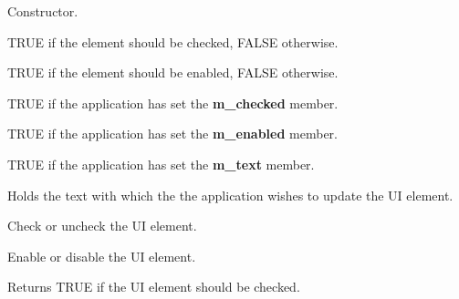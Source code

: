

Constructor.



TRUE if the element should be checked, FALSE otherwise.



TRUE if the element should be enabled, FALSE otherwise.



TRUE if the application has set the {\bf m\_checked} member.



TRUE if the application has set the {\bf m\_enabled} member.



TRUE if the application has set the {\bf m\_text} member.



Holds the text with which the the application wishes to
update the UI element.

\label{wxupdateuieventcheck}


Check or uncheck the UI element.

\label{wxupdateuieventenable}


Enable or disable the UI element.

\label{wxupdateuieventgetchecked}


Returns TRUE if the UI element should be checked.

